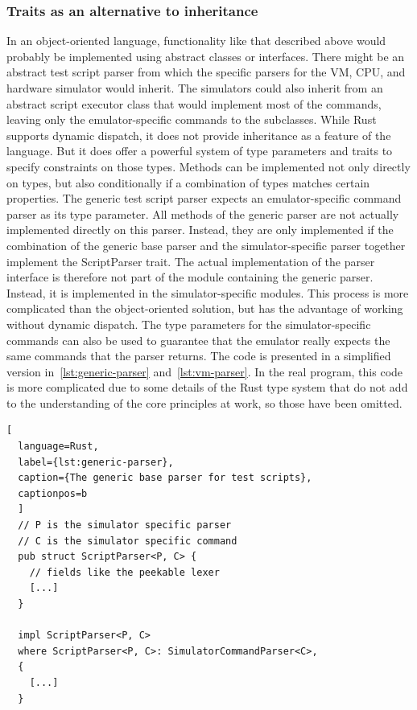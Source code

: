 \subsubsection{Traits as an alternative to inheritance}
In an object-oriented language, functionality like that described above would probably be implemented using abstract classes or interfaces. There might be an abstract test script parser from which the specific parsers for the VM, CPU, and hardware simulator would inherit.
The simulators could also inherit from an abstract script executor class that would implement most of the commands, leaving only the emulator-specific commands to the subclasses.
While Rust supports dynamic dispatch, it does not provide inheritance as a feature of the language.
But it does offer a powerful system of type parameters and traits to specify constraints on those types.
Methods can be implemented not only directly on types, but also conditionally if a combination of types matches certain properties.
The generic test script parser expects an emulator-specific command parser as its type parameter.
All methods of the generic parser are not actually implemented directly on this parser. Instead, they are only implemented if the combination of the generic base parser and the simulator-specific parser together implement the ScriptParser trait.
The actual implementation of the parser interface is therefore not part of the module containing the generic parser. Instead, it is implemented in the simulator-specific modules.
This process is more complicated than the object-oriented solution, but has the advantage of working without dynamic dispatch. The type parameters for the simulator-specific commands can also be used to guarantee that the emulator really expects the same commands that the parser returns.
The code is presented in a simplified version in~\cref{lst:generic-parser} and~\cref{lst:vm-parser}.
In the real program, this code is more complicated due to some details of the Rust type system that do not add to the understanding of the core principles at work, so those have been omitted.

\begin{lstlisting}[
  language=Rust,
  label={lst:generic-parser},
  caption={The generic base parser for test scripts},
  captionpos=b
  ]
  // P is the simulator specific parser
  // C is the simulator specific command
  pub struct ScriptParser<P, C> {
    // fields like the peekable lexer
    [...]
  }

  impl ScriptParser<P, C>
  where ScriptParser<P, C>: SimulatorCommandParser<C>,
  {
    [...]
  }
\end{lstlisting}

